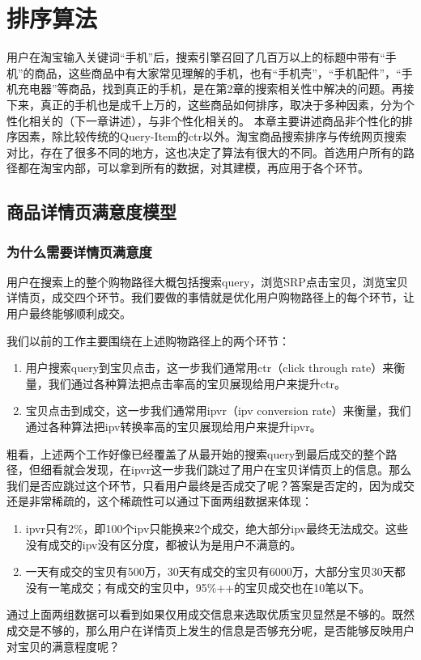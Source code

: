 
\chapter{ 排序算法 }
\thispagestyle{empty}

\setlength{\fboxrule}{0pt}\setlength{\fboxsep}{0cm}
\noindent\shadowbox{
\begin{tcolorbox}[arc=0mm,colback=lightblue,colframe=darkblue,title=学习目标与要求]

\end{tcolorbox}}
\setlength{\fboxrule}{1pt}\setlength{\fboxsep}{4pt} 

用户在淘宝输入关键词“手机”后，搜索引擎召回了几百万以上的标题中带有“手机”的商品，这些商品中有大家常见理解的手机，也有“手机壳”，“手机配件”，“手机充电器”等商品，找到真正的手机，是在第2章的搜索相关性中解决的问题。再接下来，真正的手机也是成千上万的，这些商品如何排序，取决于多种因素，分为个性化相关的（下一章讲述），与非个性化相关的。
本章主要讲述商品非个性化的排序因素，除比较传统的Query-Item的ctr以外。淘宝商品搜索排序与传统网页搜索对比，存在了很多不同的地方，这也决定了算法有很大的不同。首选用户所有的路径都在淘宝内部，可以拿到所有的数据，对其建模，再应用于各个环节。


\section{商品详情页满意度模型} 
\subsection{为什么需要详情页满意度}
用户在搜索上的整个购物路径大概包括搜索query，浏览SRP点击宝贝，浏览宝贝详情页，成交四个环节。我们要做的事情就是优化用户购物路径上的每个环节，让用户最终能够顺利成交。
\par 我们以前的工作主要围绕在上述购物路径上的两个环节：
\begin{enumerate}
\item 用户搜索query到宝贝点击，这一步我们通常用ctr（click through rate）来衡量，我们通过各种算法把点击率高的宝贝展现给用户来提升ctr。
\item 宝贝点击到成交，这一步我们通常用ipvr（ipv conversion rate）来衡量，我们通过各种算法把ipv转换率高的宝贝展现给用户来提升ipvr。
\end{enumerate}
粗看，上述两个工作好像已经覆盖了从最开始的搜索query到最后成交的整个路径，但细看就会发现，在ipvr这一步我们跳过了用户在宝贝详情页上的信息。那么我们是否应跳过这个环节，只看用户最终是否成交了呢？答案是否定的，因为成交还是非常稀疏的，这个稀疏性可以通过下面两组数据来体现：
\begin{enumerate}
\item ipvr只有2\%，即100个ipv只能换来2个成交，绝大部分ipv最终无法成交。这些没有成交的ipv没有区分度，都被认为是用户不满意的。
\item 一天有成交的宝贝有500万，30天有成交的宝贝有6000万，大部分宝贝30天都没有一笔成交；有成交的宝贝中，95\%++的宝贝成交也在10笔以下。
\end{enumerate}
通过上面两组数据可以看到如果仅用成交信息来选取优质宝贝显然是不够的。既然成交是不够的，那么用户在详情页上发生的信息是否够充分呢，是否能够反映用户对宝贝的满意程度呢？
